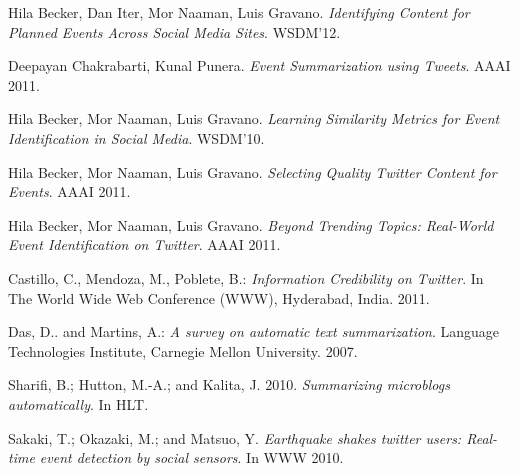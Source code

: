 \documentclass[11pt,letterpaper]{article}
\begin{document}
\begin{thebibliography}{9}

Hila Becker, Dan Iter, Mor Naaman, Luis Gravano. \emph{Identifying Content for Planned Events Across Social Media Sites}. WSDM'12.


Deepayan Chakrabarti, Kunal Punera. \emph{Event Summarization using Tweets}. AAAI 2011.


Hila Becker, Mor Naaman, Luis Gravano. \emph{Learning Similarity Metrics for Event Identification in Social Media}. WSDM'10.


Hila Becker, Mor Naaman, Luis Gravano. \emph{Selecting Quality Twitter Content for Events}. AAAI 2011.


Hila Becker, Mor Naaman, Luis Gravano. \emph{Beyond Trending Topics: Real-World Event Identification on Twitter}. AAAI 2011.


Castillo, C., Mendoza, M., Poblete, B.: \emph{Information Credibility on Twitter}. In The World Wide Web Conference (WWW), Hyderabad, India. 2011.


Das, D.. and Martins, A.: \emph{A survey on automatic text
summarization}. Language Technologies Institute, Carnegie Mellon
University. 2007.


Sharifi, B.; Hutton, M.-A.; and Kalita, J. 2010. \emph{Summarizing
     microblogs automatically}. In HLT.


Sakaki, T.; Okazaki, M.; and Matsuo, Y. \emph{Earthquake shakes
twitter users: Real-time event detection by social sensors}. In WWW 2010.

\end{thebibliography}
\end{document}
